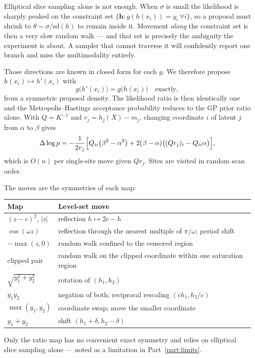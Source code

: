 \documentclass[11pt]{article}
\begin{document}
Elliptical slice sampling alone is not enough. When $\sigma$ is small the
likelihood is sharply peaked on the constraint set
$\{\mathbf{h}: g(h(x_i))=y_i\ \forall i\}$, so a proposal must shrink to
$\theta\sim\sigma/\mathrm{sd}(h)$ to remain inside it. Movement \emph{along} the
constraint set is then a very slow random walk --- and that set is precisely the
ambiguity the experiment is about. A sampler that cannot traverse it will
confidently report one branch and miss the multimodality entirely.

Those directions are known in closed form for each $g$. We therefore propose
$h(x_i)\mapsto h'(x_i)$ with
\begin{equation}
g\bigl(h'(x_i)\bigr)=g\bigl(h(x_i)\bigr)\quad\text{exactly},
\end{equation}
from a symmetric proposal density. The likelihood ratio is then identically one
and the Metropolis--Hastings acceptance probability reduces to the GP prior ratio
alone. With $Q=K^{-1}$ and $r_j=h_j(X)-m_j$, changing coordinate $i$ of latent
$j$ from $\alpha$ to $\beta$ gives
\begin{equation}
\Delta\log p=-\frac{1}{2v_j}\Bigl[Q_{ii}\bigl(\beta^2-\alpha^2\bigr)
+2(\beta-\alpha)\bigl((Qr_j)_i-Q_{ii}\alpha\bigr)\Bigr],
\label{eq:priorratio}
\end{equation}
which is $O(n)$ per single-site move given $Qr_j$. Sites are visited in random
scan order.

The moves are the symmetries of each map:
\begin{center}
\begin{tabular}{ll}
\toprule
Map & Level-set move \\
\midrule
$(z-c)^2$, $|z|$        & reflection $h\mapsto 2c-h$ \\
$\cos(\omega z)$        & reflection through the nearest multiple of $\pi/\omega$; period shift \\
$-\max(z,0)$            & random walk confined to the censored region \\
clipped pair            & random walk on the clipped coordinate within one saturation region \\
$\sqrt{y_1^2+y_2^2}$    & rotation of $(h_1,h_2)$ \\
$y_1y_2$                & negation of both; reciprocal rescaling $(ch_1,h_2/c)$ \\
$\max(y_1,y_2)$         & coordinate swap; move the smaller coordinate \\
$y_1+y_2$               & shift $(h_1+\delta,h_2-\delta)$ \\
\bottomrule
\end{tabular}
\end{center}
Only the ratio map has no convenient exact symmetry and relies on elliptical
slice sampling alone --- noted as a limitation in Part~\ref{part:limits}.
\end{document}
